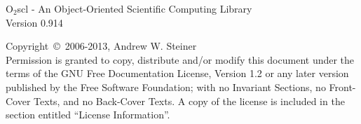 \documentclass{article}
\begin{document}
\hypersetup{pageanchor=false,citecolor=blue}

\begin{titlepage}
\vspace*{7cm}
\begin{center}
{\huge O$_2$scl - An Object-Oriented Scientific Computing Library\\
[1ex]\large Version 0.914}\\
\end{center}
\vfill
Copyright~{\copyright}~2006-2013,
Andrew W. Steiner \\
Permission is granted to copy, distribute and/or modify this document
under the terms of the GNU Free Documentation License, Version 1.2 or
any later version published by the Free Software Foundation; with no
Invariant Sections, no Front-Cover Texts, and no Back-Cover Texts.  A
copy of the license is included in the section entitled ``License
Information''.
\end{titlepage}

\tableofcontents
{}
\hypersetup{pageanchor=true,citecolor=blue}
\end{document}

